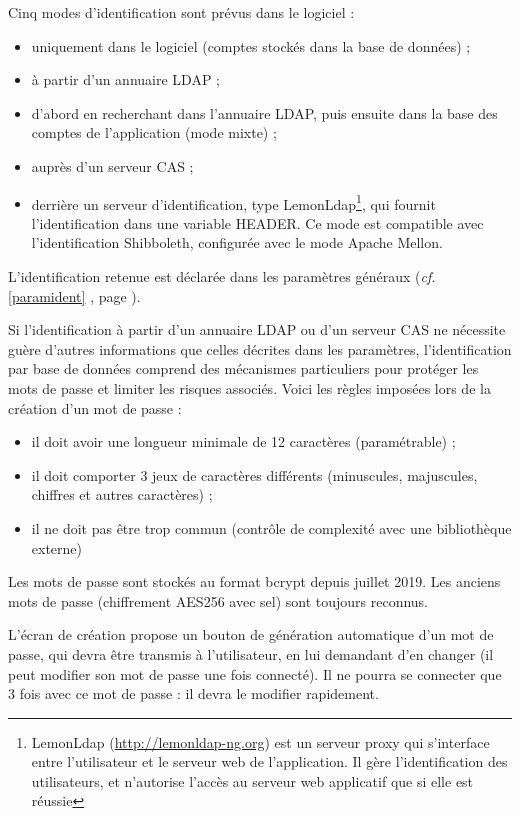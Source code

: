 Cinq modes d'identification sont prévus dans le logiciel :
\begin{itemize}
\item uniquement dans le logiciel (comptes stockés dans la base de données) ;
\item à partir d'un annuaire LDAP ;
\item d'abord en recherchant dans l'annuaire LDAP, puis ensuite dans la base des comptes de l'application (mode mixte) ;
\item auprès d'un serveur CAS ;
\item derrière un serveur d'identification, type LemonLdap\footnote{LemonLdap (\url{http://lemonldap-ng.org}) est un serveur proxy qui s'interface entre l'utilisateur et le serveur web de l'application. Il gère l'identification des utilisateurs, et n'autorise l'accès au serveur web applicatif que si elle est réussie}, qui fournit l'identification dans une variable HEADER. Ce mode est compatible avec l'identification Shibboleth, configurée avec le mode Apache Mellon.
\end{itemize}

L'identification retenue est déclarée dans les paramètres généraux (\textit{cf.} \ref{paramident} \textit{}, page \pageref{paramident}).

Si l'identification à partir d'un annuaire LDAP ou d'un serveur CAS ne nécessite guère d'autres informations que celles décrites dans les paramètres, l'identification par base de données comprend des mécanismes particuliers pour protéger les mots de passe et limiter les risques associés. Voici les règles imposées lors de la création d'un mot de passe : 
\begin{itemize}
\item il doit avoir une longueur minimale de 12 caractères (paramétrable) ;
\item il doit comporter 3 jeux de caractères différents (minuscules, majuscules, chiffres et autres caractères) ;
\item il ne doit pas être trop commun (contrôle de complexité avec une bibliothèque externe)
\end{itemize}

Les mots de passe sont stockés au format bcrypt depuis juillet 2019. Les anciens mots de passe (chiffrement AES256 avec sel) sont toujours reconnus.

L'écran de création propose un bouton de génération automatique d'un mot de passe, qui devra être transmis à l'utilisateur, en lui demandant d'en changer (il peut modifier son mot de passe une fois connecté). Il ne pourra se connecter que 3 fois avec ce mot de passe : il devra le modifier rapidement.

